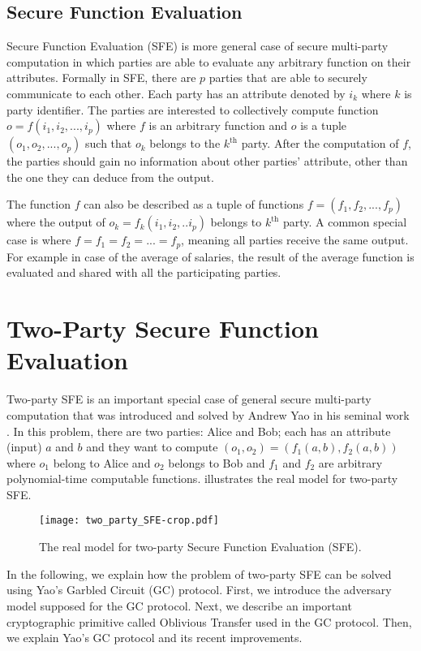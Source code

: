 \subsection{Secure Function Evaluation}\label{ssec:prelim-sfe}
Secure Function Evaluation (SFE) is more general case of secure multi-party computation in which parties are able to evaluate any arbitrary function on their attributes.
Formally in SFE, there are $p$ parties that are able to securely communicate to each other.
Each party has an attribute denoted by $i_k$ where $k$ is party identifier.
The parties are interested to collectively compute function $o = f(i_1, i_2, ..., i_p)$ where $f$ is an arbitrary function and $o$ is a tuple $(o_1, o_2, ..., o_p)$ such that $o_k$ belongs to the $k^{\text{th}}$ party.
After the computation of $f$, the parties should gain no information about other parties' attribute, other than the one they can deduce from the output.

The function $f$ can also be described as a tuple of functions $f = (f_1, f_2, ...,  f_p)$ where the output of $o_k = f_k(i_1, i_2, .. i_p)$ belongs to $k^{\text{th}}$ party.
A common special case is where $f = f_1 = f_2 = ... = f_p$, meaning all parties receive the same output.
For example in case of the average of salaries, the result of the average function is evaluated and shared with all the participating parties.

\section{Two-Party Secure Function Evaluation}\label{sec:prelim-2sfe}
Two-party SFE is an important special case of general secure multi-party computation that was introduced and solved by Andrew Yao in his seminal work \cite{yao1986generate}.
In this problem, there are two parties: Alice and Bob; each has an attribute (input) $a$ and $b$ and they want to compute $(o_1, o_2) = (f_1(a, b), f_2(a, b))$ where $o_1$ belong to Alice and $o_2$ belongs to Bob and $f_1$ and $f_2$ are arbitrary polynomial-time computable functions.
 illustrates the real model for two-party SFE.

\begin{figure}[ht]
\centering
\texttt{[image: two\_party\_SFE-crop.pdf]}
\caption{The real model for two-party Secure Function Evaluation (SFE).}
\label{fig:two-party-sfe}
\end{figure}

In the following, we explain how the problem of two-party SFE can be solved using Yao's Garbled Circuit (GC) protocol.
First, we introduce the adversary model supposed for the GC protocol.
Next, we describe an important cryptographic primitive called Oblivious Transfer used in the GC protocol.
Then, we explain Yao's GC protocol and its recent improvements.

